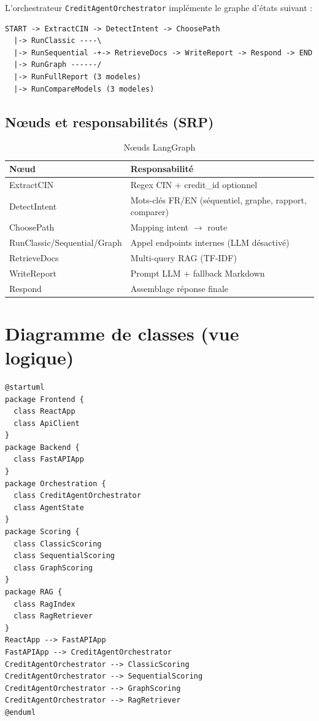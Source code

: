 L'orchestrateur \texttt{CreditAgentOrchestrator} implémente le graphe d'états suivant :

\begin{lstlisting}[language={},caption={Workflow LangGraph (PlantUML activité)},label={lst:langgraph}]
START -> ExtractCIN -> DetectIntent -> ChoosePath
  |-> RunClassic ----\
  |-> RunSequential -+-> RetrieveDocs -> WriteReport -> Respond -> END
  |-> RunGraph ------/
  |-> RunFullReport (3 modeles)
  |-> RunCompareModels (3 modeles)
\end{lstlisting}

\subsection{Nœuds et responsabilités (SRP)}

\begin{table}[H]
  \centering
  \caption{Nœuds LangGraph}
  \begin{tabular}{|l|p{9cm}|}
    \hline
    \textbf{Nœud} & \textbf{Responsabilité} \\
    \hline
    ExtractCIN & Regex CIN + credit\_id optionnel \\
    \hline
    DetectIntent & Mots-clés FR/EN (séquentiel, graphe, rapport, comparer) \\
    \hline
    ChoosePath & Mapping intent $\rightarrow$ route \\
    \hline
    RunClassic/Sequential/Graph & Appel endpoints internes (LLM désactivé) \\
    \hline
    RetrieveDocs & Multi-query RAG (TF-IDF) \\
    \hline
    WriteReport & Prompt LLM + fallback Markdown \\
    \hline
    Respond & Assemblage réponse finale \\
    \hline
  \end{tabular}
\end{table}

\section{Diagramme de classes (vue logique)}

\begin{lstlisting}[language={},caption={Diagramme de classes simplifié (PlantUML)},label={lst:class}]
@startuml
package Frontend {
  class ReactApp
  class ApiClient
}
package Backend {
  class FastAPIApp
}
package Orchestration {
  class CreditAgentOrchestrator
  class AgentState
}
package Scoring {
  class ClassicScoring
  class SequentialScoring
  class GraphScoring
}
package RAG {
  class RagIndex
  class RagRetriever
}
ReactApp --> FastAPIApp
FastAPIApp --> CreditAgentOrchestrator
CreditAgentOrchestrator --> ClassicScoring
CreditAgentOrchestrator --> SequentialScoring
CreditAgentOrchestrator --> GraphScoring
CreditAgentOrchestrator --> RagRetriever
@enduml
\end{lstlisting}

